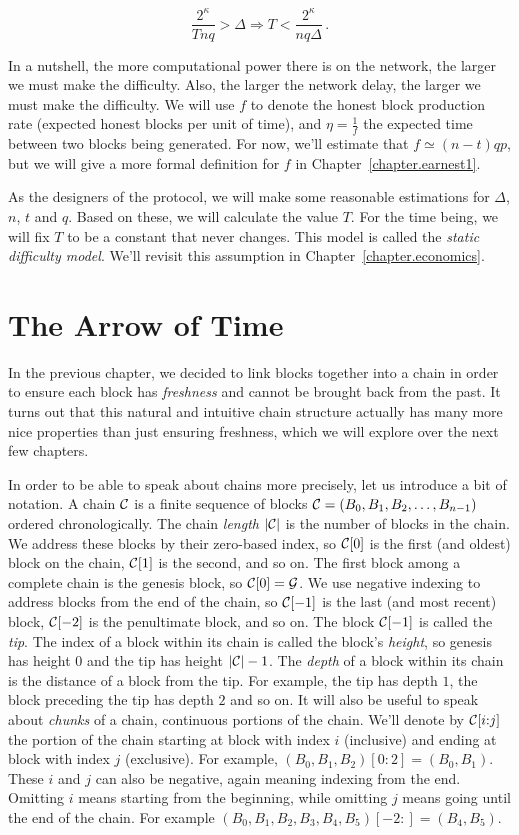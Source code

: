 \[
  \frac{2^\kappa}{Tnq} > \Delta \Rightarrow T < \frac{2^\kappa}{nq\Delta}\,.
\]

In a nutshell, the more computational power there is on the network, the larger we must make the difficulty.
Also, the larger the network delay, the larger we must make the difficulty.
We will use $f$ to denote the honest block production rate (expected honest blocks per unit of time),
and $\eta = \frac{1}{f}$ the expected time between two blocks being generated.
For now, we'll estimate that $f \simeq (n - t)qp$, but we will give a more
formal definition for $f$ in Chapter~\ref{chapter.earnest1}.

As the designers of the protocol, we will make some reasonable estimations for $\Delta$, $n$, $t$ and $q$.
Based on these, we will calculate the value $T$. For the time being, we will fix $T$ to be a constant
that never changes. This model is called the \emph{static difficulty model}. We'll revisit this assumption
in Chapter~\ref{chapter.economics}.

\section{The Arrow of Time}

In the previous chapter, we decided to link blocks together into a chain in order to ensure each block
has \emph{freshness} and cannot be brought back from the past. It turns out that this natural and
intuitive chain structure actually has many more nice properties than just ensuring freshness, which
we will explore over the next few chapters.

In order to be able to speak about chains more precisely,
let us introduce a bit of notation. A chain $\mathcal{C}$ is a finite sequence of blocks
$\mathcal{C} = (B_0, B_1, B_2, \ldots, B_{n-1})$ ordered chronologically.
The chain \emph{length} $|\mathcal{C}|$ is the number of blocks in the chain.
We address these blocks by their zero-based index,
so $\mathcal{C}[0]$ is the first (and oldest) block on the chain, $\mathcal{C}[1]$ is the second, and so on.
The first block among a complete chain is the genesis block, so $\mathcal{C}[0] = \mathcal{G}$.
We use negative indexing to address blocks from the end of the chain, so $\mathcal{C}[-1]$
is the last (and most recent) block, $\mathcal{C}[-2]$ is the penultimate block, and so on.
The block $\mathcal{C}[-1]$ is called the \emph{tip}.
The index of a block within its chain is called the block's \emph{height},
so genesis has height $0$ and the tip has height $|\mathcal{C}| - 1$.
The \emph{depth} of a block within its chain is the distance of a block
from the tip. For example, the tip has depth $1$, the block preceding the
tip has depth $2$ and so on.
It will also be useful to speak about \emph{chunks} of a chain, continuous portions
of the chain. We'll denote by $\mathcal{C}[i{:}j]$ the portion of the chain starting at block
with index $i$ (inclusive) and ending at block with index $j$ (exclusive). For example,
$(B_0, B_1, B_2)[0{:}2] = (B_0, B_1)$. These $i$ and $j$ can also be negative, again meaning
indexing from the end. Omitting $i$ means starting from the beginning, while
omitting $j$ means going until the end of the chain. For example
$(B_0, B_1, B_2, B_3, B_4, B_5)[-2{:}] = (B_4, B_5)$.

